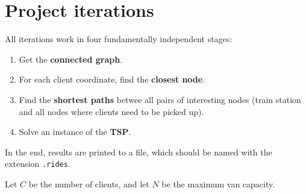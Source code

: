 \chapter{Project iterations} \label{iterations}

All iterations work in four fundamentally independent stages:
\begin{enumerate}
    \item Get the \textbf{connected graph}.
    \item For each client coordinate, find the \textbf{closest node}.
    \item Find the \textbf{shortest paths} betwee all pairs of interesting nodes (train station and all nodes where clients need to be picked up).
    \item Solve an instance of the \textbf{\acrlong*{TSP}}.
\end{enumerate}

In the end, results are printed to a file, which should be named with the extension \texttt{.rides}.\par

Let $C$ be the number of clients, and let $N$ be the maximum van capacity.


